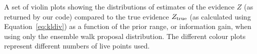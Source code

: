\label{fig:walkpropevs}
A set of violin plots showing the distributions of estimates of the evidence
$Z$ (as returned by our code) compared to the true evidence $Z_{\rm true}$ (as
calculated using Equation~\ref{eq:kldiv}) as a function of the prior range,
or information gain, when using only the ensemble walk proposal
distribution. The different colour plots represent different numbers
of live points used.
